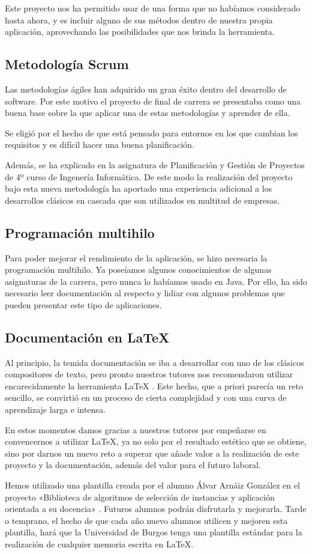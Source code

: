 Este proyecto nos ha permitido usar \weka{} de una forma que no habíamos considerado hasta ahora, y es incluir alguno de sus métodos dentro de nuestra propia aplicación, aprovechando las posibilidades que nos brinda la herramienta.

\subsection{Metodología Scrum}
Las metodologías ágiles han adquirido un gran éxito dentro del desarrollo de software. Por este motivo el proyecto de final de carrera se presentaba como una buena base sobre la que aplicar una de estas metodologías y aprender de ella.

Se eligió \scrum{} por el hecho de que está pensado para entornos en los que cambian los requisitos y es difícil hacer una buena planificación.

Además, \scrum{} se ha explicado en la asignatura de Planificación y Gestión de Proyectos de 4º curso de Ingenería Informática. De este modo la realización del proyecto bajo esta nueva metodología ha aportado una experiencia adicional a los desarrollos clásicos en cascada que son utilizados en multitud de empresas.

\subsection{Programación multihilo}
Para poder mejorar el rendimiento de la aplicación, se hizo necesaria la programación multihilo. Ya poseíamos algunos conocimientos de algunas asignaturas de la carrera, pero nunca lo habíamos usado en Java. Por ello, ha sido necesario leer documentación al respecto y lidiar con algunos problemas que pueden presentar este tipo de aplicaciones.

\subsection{Documentación en \LaTeX{}}
Al principio, la temida documentación se iba a desarrollar con uno de los clásicos compositores
de texto, pero pronto nuestros tutores nos recomendaron utilizar encarecidamente la herramienta
\LaTeX{} \cite{lamport1989latex}. Este hecho, que a priori parecía un reto sencillo, se convirtió en un proceso de cierta complejidad y con una curva de aprendizaje larga e intensa.

En estos momentos damos gracias a nuestros tutores por empeñarse en convencernos a utilizar
\LaTeX{}, ya no solo por el resultado estético que se obtiene, sino por darnos un nuevo reto a superar
que añade valor a la realización de este proyecto y la documentación, además del valor para el
futuro laboral.

Hemos utilizado una plantilla creada por el alumno Álvar Arnáiz González en el proyecto «Biblioteca
de algoritmos de selección de instancias y aplicación orientada a su docencia» \cite{proyectoAlvar}. Futuros alumnos podrán disfrutarla y mejorarla. Tarde o temprano, el hecho de que cada año nuevo
alumnos utilicen y mejoren esta plantilla, hará que la Universidad de Burgos tenga una plantilla
estándar para la realización de cualquier memoria escrita en \LaTeX{}.
